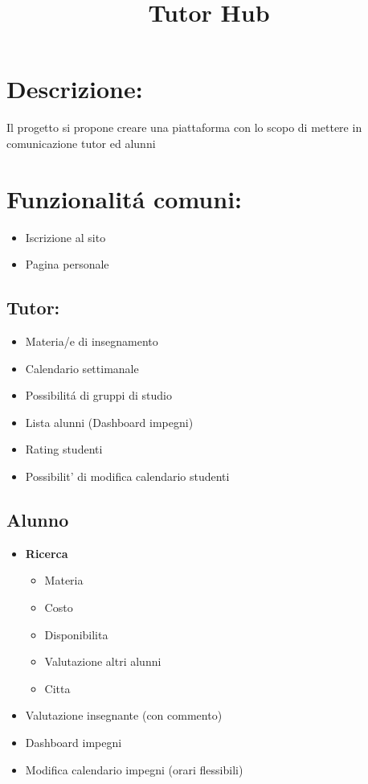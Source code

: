 \documentclass[12pt,a4paper]{article}
\begin{document}
\setlength{\voffset}{-5cm}
\title{\bf{\Huge Tutor Hub}}
\author{}
\date{}
\maketitle

\section*{Descrizione:}
Il progetto si propone creare una piattaforma con lo scopo di mettere in comunicazione tutor ed alunni

\section*{Funzionalit\'a comuni:}
\begin{itemize}
\item Iscrizione al sito
\item Pagina personale
\end{itemize}
\begin{multicols}{2}


\subsection*{Tutor:}
\begin{itemize}
\item Materia/e di insegnamento
\item Calendario settimanale
\item Possibilit\'a di gruppi di studio
\item Lista alunni (Dashboard impegni)
\item Rating studenti
\item Possibilit\a' di modifica calendario studenti\\
\end{itemize}


\subsection*{Alunno}
\begin{itemize}
\item \textbf{Ricerca}
\begin{itemize}
\item Materia
\item Costo
\item Disponibilita
\item Valutazione altri alunni
\item Citta
\end{itemize}
\item Valutazione insegnante (con commento)
\item Dashboard impegni
\item Modifica calendario impegni (orari flessibili)
\end{itemize}

\end{multicols}
\end{document}
